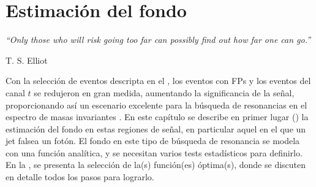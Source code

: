\chapter{Estimación del fondo}
\label{ch:bkg}
\epigraph{\emph{``Only those who will risk going too far can possibly find out how far one can go.”}}{T. S. Elliot}


Con la selección de eventos descripta en el \Ch{\ref{ch:evt_selection}}, los eventos con \acp{FP} y los eventos del canal \(t\) se redujeron en gran medida, aumentando la significancia de la señal, proporcionando así un escenario excelente para la búsqueda de resonancias en el espectro de masas invariantes \myj. En este capítulo se describe en primer lugar (\Sect{\ref{sec:bkg:estimation}}) la estimación del fondo en estas regiones de señal, en particular aquel en el que un jet falsea un fotón. El fondo en este tipo de búsqueda de resonancia se modela con una función analítica, y se necesitan varios tests estadísticos para definirlo. En la \Sect{\ref{sec:bkg:modeling}}, se presenta la selección de la(s) función(es) óptima(s), donde se discuten en detalle todos los pasos para lograrlo.






